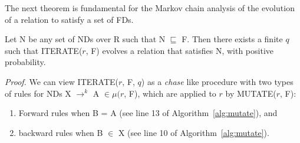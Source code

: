 {\line
\begin{figure}[ht]
\begin{center}
\end{center}
\end{figure}
}
\medskip

The next theorem is fundamental for the Markov chain analysis of 
the evolution of a relation to satisfy a set of FDs.

\begin{theorem}\label{theorem:iter}
\begin{rm}
Let N be any set of NDs over R such that N $\sqsubseteq$ F.
Then there exists a finite $q$ such that ITERATE($r$, F) 
evolves a relation that satisfies N, with positive probability.
\end{rm}
\end{theorem}
{\em Proof.} 
We can view ITERATE($r$, F, $q$) as a {\em chase} like procedure \cite{Mann92}
with two types of rules for NDs X $\to^k$ A $\in \mu(r$, F),
which are applied to $r$ by MUTATE($r$, F):

\begin{enumerate}
\item Forward rules when B = A (see line 13 of Algorithm~\ref{alg:mutate}),
and 
\item backward rules when B $\in$ X (see line 10 of Algorithm~\ref{alg:mutate}).
\end{enumerate}
\smallskip

